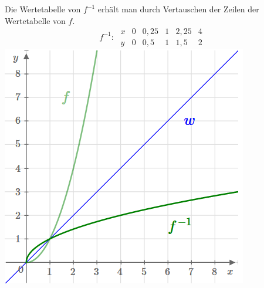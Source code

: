 \documentclass[a4paper,10pt]{article}
\begin{document}
\begin{multicols}{3}
    Die Wertetabelle von $f^{-1}$ erhält man durch Vertauschen der Zeilen der Wertetabelle von $f$.
    \[f^{-1}\colon\; \begin{array}{r|c|c|c|c|c} x & 0 & 0{,}25 & 1 & 2{,}25 & 4 \\ \hline y & 0 & 0{,}5 & 1 & 1{,}5 & 2 \end{array}\]
    \includegraphics{wurzelfunktion2}\\~\\

\end{multicols}
\end{document}

